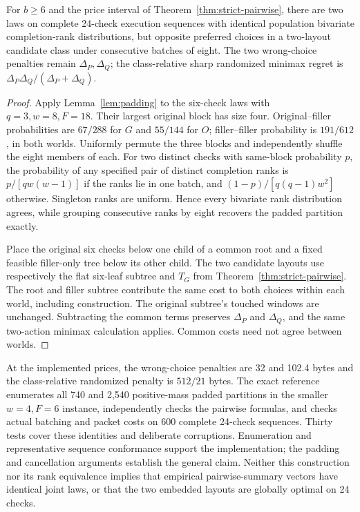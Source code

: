 \begin{proposition}\label{prop:fixed-eight}
For $b\ge6$ and the price interval of Theorem~\ref{thm:strict-pairwise},
there are two laws on complete 24-check execution sequences with identical
population bivariate completion-rank distributions, but opposite preferred
choices in a two-layout candidate class under consecutive batches of eight.
The two wrong-choice penalties remain $\Delta_P,\Delta_Q$; the class-relative
sharp randomized minimax regret is
$\Delta_P\Delta_Q/(\Delta_P+\Delta_Q)$.
\end{proposition}
\begin{proof}
Apply Lemma~\ref{lem:padding} to the six-check laws with $q=3,w=8,F=18$.
Their largest original block has size four. Original--filler probabilities
are $67/288$ for $G$ and $55/144$ for $O$; filler--filler probability is
$191/612$, in both worlds. Uniformly permute the three blocks and
independently shuffle the eight members of each. For two distinct checks
with same-block probability $p$, the probability of any specified pair of
distinct completion ranks is $p/[qw(w-1)]$ if the ranks lie in one batch,
and $(1-p)/[q(q-1)w^2]$ otherwise. Singleton ranks are uniform. Hence every
bivariate rank distribution agrees, while grouping consecutive ranks by
eight recovers the padded partition exactly.

Place the original six checks below one child of a common root and a fixed
feasible filler-only tree below its other child. The two candidate layouts
use respectively the flat six-leaf subtree and $T_G$ from
Theorem~\ref{thm:strict-pairwise}. The root and filler subtree contribute
the same cost to both choices within each world, including construction.
The original subtree's touched windows are unchanged. Subtracting the
common terms preserves $\Delta_P$ and $\Delta_Q$, and the same two-action
minimax calculation applies. Common costs need not agree between worlds.
\end{proof}

At the implemented prices, the wrong-choice penalties are 32 and 102.4
bytes and the class-relative randomized penalty is $512/21$ bytes.
The exact reference enumerates all 740 and 2,540 positive-mass padded
partitions in the smaller $w=4,F=6$ instance, independently checks the
pairwise formulas, and checks actual batching and packet costs on 600
complete 24-check sequences. Thirty tests cover these identities and
deliberate corruptions. Enumeration and representative sequence conformance support the
implementation; the padding and cancellation arguments establish the
general claim. Neither this construction nor its rank equivalence implies
that empirical pairwise-summary vectors have identical joint laws, or
that the two embedded layouts are globally optimal on 24 checks.
